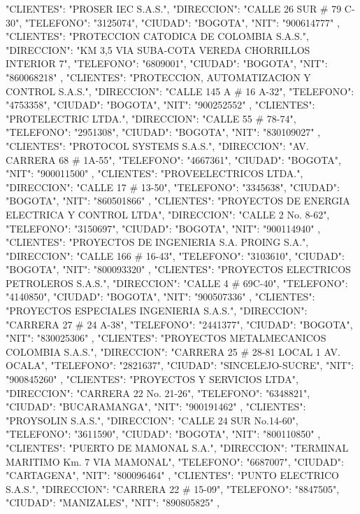    {
   "CLIENTES": "PROSER IEC S.A.S.",
   "DIRECCION": "CALLE 26 SUR # 79 C-30",
   "TELEFONO": "3125074",
   "CIUDAD": "BOGOTA",
   "NIT": "900614777"
   },
   {
   "CLIENTES": "PROTECCION CATODICA DE COLOMBIA S.A.S.",
   "DIRECCION": "KM 3,5 VIA SUBA-COTA VEREDA CHORRILLOS INTERIOR 7",
   "TELEFONO": "6809001",
   "CIUDAD": "BOGOTA",
   "NIT": "860068218"
   },
   {
   "CLIENTES": "PROTECCION, AUTOMATIZACION Y CONTROL S.A.S.",
   "DIRECCION": "CALLE 145 A # 16 A-32",
   "TELEFONO": "4753358",
   "CIUDAD": "BOGOTA",
   "NIT": "900252552"
   },
   {
   "CLIENTES": "PROTELECTRIC LTDA.",
   "DIRECCION": "CALLE 55 # 78-74",
   "TELEFONO": "2951308",
   "CIUDAD": "BOGOTA",
   "NIT": "830109027"
   },
   {
   "CLIENTES": "PROTOCOL SYSTEMS S.A.S.",
   "DIRECCION": "AV. CARRERA 68 # 1A-55",
   "TELEFONO": "4667361",
   "CIUDAD": "BOGOTA",
   "NIT": "900011500"
   },
   {
   "CLIENTES": "PROVEELECTRICOS LTDA.",
   "DIRECCION": "CALLE 17 # 13-50",
   "TELEFONO": "3345638",
   "CIUDAD": "BOGOTA",
   "NIT": "860501866"
   },
   {
   "CLIENTES": "PROYECTOS DE ENERGIA ELECTRICA Y CONTROL LTDA",
   "DIRECCION": "CALLE 2 No. 8-62",
   "TELEFONO": "3150697",
   "CIUDAD": "BOGOTA",
   "NIT": "900114940"
   },
   {
   "CLIENTES": "PROYECTOS DE INGENIERIA S.A. PROING S.A.",
   "DIRECCION": "CALLE 166 # 16-43",
   "TELEFONO": "3103610",
   "CIUDAD": "BOGOTA",
   "NIT": "800093320"
   },
   {
   "CLIENTES": "PROYECTOS ELECTRICOS PETROLEROS S.A.S.",
   "DIRECCION": "CALLE 4 # 69C-40",
   "TELEFONO": "4140850",
   "CIUDAD": "BOGOTA",
   "NIT": "900507336"
   },
   {
   "CLIENTES": "PROYECTOS ESPECIALES INGENIERIA S.A.S.",
   "DIRECCION": "CARRERA 27 # 24 A-38",
   "TELEFONO": "2441377",
   "CIUDAD": "BOGOTA",
   "NIT": "830025306"
   },
   {
   "CLIENTES": "PROYECTOS METALMECANICOS COLOMBIA S.A.S.",
   "DIRECCION": "CARRERA 25 # 28-81 LOCAL 1 AV. OCALA",
   "TELEFONO": "2821637",
   "CIUDAD": "SINCELEJO-SUCRE",
   "NIT": "900845260"
   },
   {
   "CLIENTES": "PROYECTOS Y SERVICIOS LTDA",
   "DIRECCION": "CARRERA 22 No. 21-26",
   "TELEFONO": "6348821",
   "CIUDAD": "BUCARAMANGA",
   "NIT": "900191462"
   },
   {
   "CLIENTES": "PROYSOLIN S.A.S.",
   "DIRECCION": "CALLE 24 SUR No.14-60",
   "TELEFONO": "3611590",
   "CIUDAD": "BOGOTA",
   "NIT": "800110850"
   },
   {
   "CLIENTES": "PUERTO DE MAMONAL S.A.",
   "DIRECCION": "TERMINAL MARITIMO Km. 7 VIA MAMONAL",
   "TELEFONO": "6687007",
   "CIUDAD": "CARTAGENA",
   "NIT": "800096464"
   },
   {
   "CLIENTES": "PUNTO ELECTRICO S.A.S.",
   "DIRECCION": "CARRERA 22 # 15-09",
   "TELEFONO": "8847505",
   "CIUDAD": "MANIZALES",
   "NIT": "890805825"
   },
